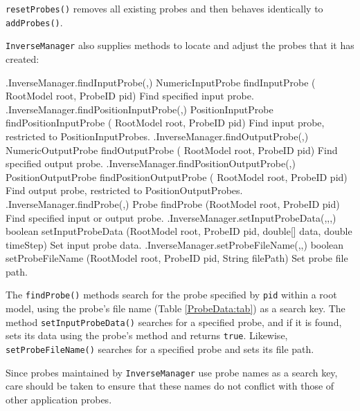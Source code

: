{\tt resetProbes()} removes all existing probes and then behaves identically to
{\tt addProbes()}.


{\tt InverseManager} also supplies methods to locate and adjust the probes that
it has created:
%
\begin{methodtable}{0.50}{0.50}
\midline
%
\methodentry
{\inverse.InverseManager.findInputProbe(,)}%
{NumericInputProbe findInputProbe (\brh
RootModel root, ProbeID pid)}%
{Find specified input probe.}%
%
\methodspace{0.5em}%
\methodentry
{\inverse.InverseManager.findPositionInputProbe(,)}%
{PositionInputProbe findPositionInputProbe (\brh
RootModel root, ProbeID pid)}%
{Find input probe, restricted to PositionInputProbes.}%
%
\methodspace{0.5em}%
\methodentry
{\inverse.InverseManager.findOutputProbe(,)}%
{NumericOutputProbe findOutputProbe (\brh
RootModel root, ProbeID pid)}%
{Find specified output probe.}%
%
\methodspace{0.5em}%
\methodentry
{\inverse.InverseManager.findPositionOutputProbe(,)}%
{PositionOutputProbe findPositionOutputProbe (\brh
RootModel root, ProbeID pid)}%
{Find output probe, restricted to PositionOutputProbes.}%
%
\methodspace{0.5em}%
\methodentry
{\inverse.InverseManager.findProbe(,)}%
{Probe findProbe (RootModel root, ProbeID pid)}%
{Find specified input or output probe.}%
%
\methodspace{0.5em}%
%
\methodentry
{\inverse.InverseManager.setInputProbeData(,,,)}%
{boolean setInputProbeData (RootModel root, \brh ProbeID pid,
double[] data, double timeStep)}%
{Set input probe data.}%
%
\methodspace{0.5em}%
\methodentry
{\inverse.InverseManager.setProbeFileName(,,)}%
{boolean setProbeFileName (RootModel root, \brh ProbeID pid,
String filePath)}%
{Set probe file path.}%
%
\midline
\end{methodtable}
%
The {\tt findProbe()} methods search for the probe specified by {\tt pid}
within a root model, using the probe's file name (Table \ref{ProbeData:tab}) as
a search key. The method {\tt setInputProbeData()} searches for a specified
probe, and if it is found, sets its data using the probe's 
method and returns {\tt true}. Likewise, {\tt setProbeFileName()} searches for
a specified probe and sets its file path.

\begin{sideblock}
Since probes maintained by {\tt InverseManager} use probe names as a search
key, care should be taken to ensure that these names do not conflict with those
of other application probes.
\end{sideblock}

